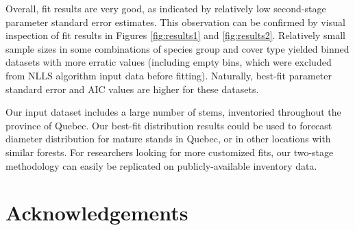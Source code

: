 \documentclass{article}
\begin{document}
Overall, fit results are very good, as indicated by relatively low second-stage parameter standard error estimates.
This observation can be confirmed by visual inspection of fit results in Figures \ref{fig:results1} and \ref{fig:results2}.
Relatively small sample sizes in some combinations of species group and cover type yielded binned datasets with more erratic values (including empty bins, which were excluded from NLLS algorithm input data before fitting).
Naturally, best-fit parameter standard error and AIC values are higher for these datasets. 

Our input dataset includes a large number of stems, inventoried throughout the province of Quebec.
Our best-fit distribution results could be used to forecast diameter distribution for mature stands in Quebec, or in other locations with similar forests.
For researchers looking for more customized fits, our two-stage methodology can easily be replicated on publicly-available inventory data.




\section{Acknowledgements}
\end{document}
